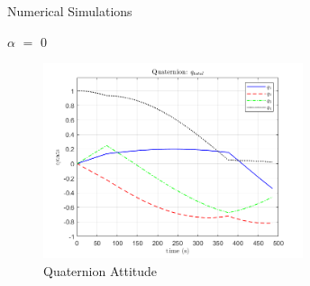 \documentclass{beamer}
\begin{document}
\begin{frame}{Numerical Simulations}
	\begin{block}{$\alpha$ $=$ 0}
		
		\begin{figure}[H]
			\label{fig:quats_phi_total_alpha0}
			\begin{center}
				\includegraphics[width=3in]{figures/alpha0/quats.png}
			\end{center}
			\caption{Quaternion Attitude}
		\end{figure}
		
	\end{block}
\end{frame}
\end{document}

